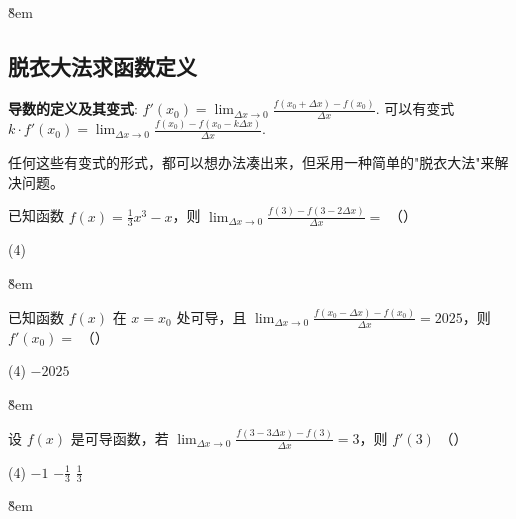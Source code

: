 \v{8em}

\subsection{脱衣大法求函数定义}

\begin{theorem}[脱衣大法]
    \textbf{导数的定义及其变式}:
    $f'(x_0) = \lim_{\Delta x \to 0}\frac{f(x_0 + \Delta x) - f(x_0)}{\Delta x}$.
    可以有变式 $k \cdot f'(x_0) = \lim_{\Delta x \to 0}\frac{f(x_0) - f(x_0 - k \Delta x)}{\Delta x}$.

    任何这些有变式的形式，都可以想办法凑出来，但采用一种简单的"脱衣大法"来解决问题。
\end{theorem}
\begin{example}
    已知函数 $f(x) = \frac{1}{3}x^{3} - x$，则 $\lim_{\Delta x \to 0}\frac{f(3) - f(3 - 2 \Delta x)}{\Delta x} =$ （\quad）
    \begin{tasks}(4)
           
    \end{tasks}
\end{example}

\v{8em}

\begin{example}
    已知函数 $f(x)$ 在 $x = x_{0}$ 处可导，且 $\lim_{\Delta x \to 0}\frac{f(x_{0} - \Delta x) - f(x_{0})}{\Delta x} = 2025$，则 $f'(x_{0}) =$ （\quad）
    \begin{tasks}(4)
        \task $- 2025$   
    \end{tasks}
\end{example}

\v{8em}

\begin{example}
    设 $f(x)$ 是可导函数，若 $\lim_{\Delta x \to 0}\frac{f(3 - 3\Delta x) - f(3)}{\Delta x} = 3$，则 $f'(3)$ （\quad）
    \begin{tasks}(4)
        \task $- 1$ \task $- \frac{1}{3}$ \task $\frac{1}{3}$ 
    \end{tasks}
\end{example}

\v{8em}